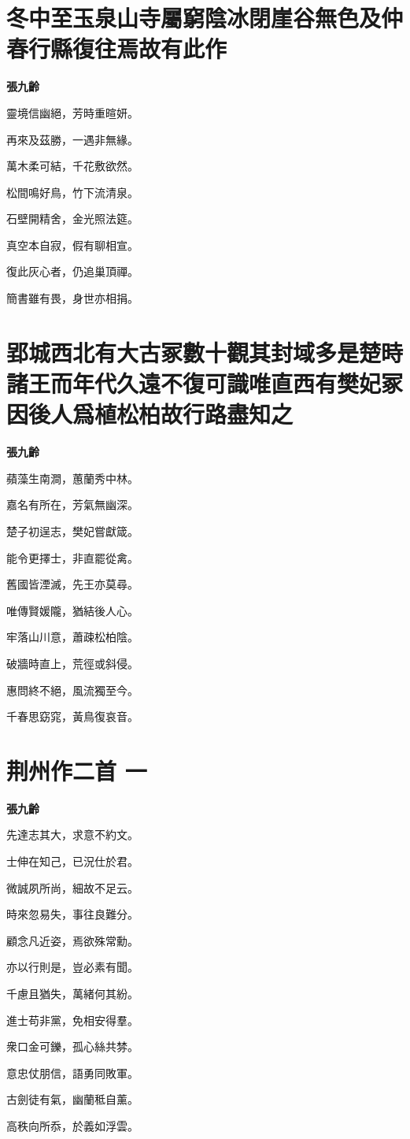 \documentclass[12pt,a4paper]{ctexbook}
\begin{document}
\section{冬中至玉泉山寺屬窮陰冰閉崖谷無色及仲春行縣復往焉故有此作}
\textbf{張九齡}\par\vspace{0.5em}
靈境信幽絕，芳時重暄妍。\par
再來及茲勝，一遇非無緣。\par
萬木柔可結，千花敷欲然。\par
松間鳴好鳥，竹下流清泉。\par
石壁開精舍，金光照法筵。\par
真空本自寂，假有聊相宣。\par
復此灰心者，仍追巢頂禪。\par
簡書雖有畏，身世亦相捐。\par

\section{郢城西北有大古冢數十觀其封域多是楚時諸王而年代久遠不復可識唯直西有樊妃冢因後人爲植松柏故行路盡知之}
\textbf{張九齡}\par\vspace{0.5em}
蘋藻生南澗，蕙蘭秀中林。\par
嘉名有所在，芳氣無幽深。\par
楚子初逞志，樊妃嘗獻箴。\par
能令更擇士，非直罷從禽。\par
舊國皆湮滅，先王亦莫尋。\par
唯傳賢媛隴，猶結後人心。\par
牢落山川意，蕭疎松柏陰。\par
破牆時直上，荒徑或斜侵。\par
惠問終不絕，風流獨至今。\par
千春思窈窕，黃鳥復哀音。\par

\section{荆州作二首 一}
\textbf{張九齡}\par\vspace{0.5em}
先達志其大，求意不約文。\par
士伸在知己，已況仕於君。\par
微誠夙所尚，細故不足云。\par
時來忽易失，事往良難分。\par
顧念凡近姿，焉欲殊常勳。\par
亦以行則是，豈必素有聞。\par
千慮且猶失，萬緒何其紛。\par
進士苟非黨，免相安得羣。\par
衆口金可鑠，孤心絲共棼。\par
意忠仗朋信，語勇同敗軍。\par
古劍徒有氣，幽蘭秪自薰。\par
高秩向所忝，於義如浮雲。\par
\end{document}
